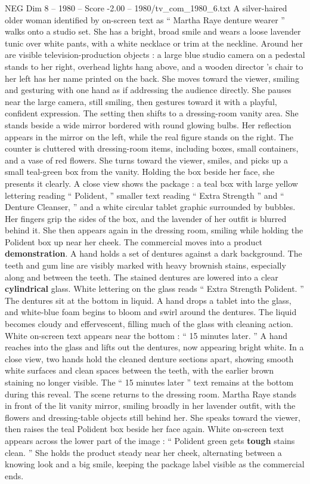 \begin{textsample}{NEG Dim 8 – 1980 – Score -2.00 – 1980/tv\_com\_1980\_6.txt}  \label{ex:f8_neg_057}
A silver-haired older woman identified by on-screen text as “ Martha Raye denture wearer ” walks onto a studio set.
She has a bright, broad smile and wears a loose lavender tunic over white pants, with a white necklace or trim at the neckline.
Around her are visible television-production objects : a large blue studio camera on a pedestal stands to her right, overhead lights hang above, and a wooden director ’s chair to her left has her name printed on the back.
She moves toward the viewer, smiling and gesturing with one hand as if addressing the audience directly.
She pauses near the large camera, still smiling, then gestures toward it with a playful, confident expression.
The setting then shifts to a dressing-room vanity area.
She stands beside a wide mirror bordered with round glowing bulbs.
Her reflection appears in the mirror on the left, while the real figure stands on the right.
The counter is cluttered with dressing-room items, including boxes, small containers, and a vase of red flowers.
She turns toward the viewer, smiles, and picks up a small teal-green box from the vanity.
Holding the box beside her face, she presents it clearly.
A close view shows the package : a teal box with large yellow lettering reading “ Polident, ” smaller text reading “ Extra Strength ” and “ Denture Cleanser, ” and a white circular tablet graphic surrounded by bubbles.
Her fingers grip the sides of the box, and the lavender of her outfit is blurred behind it.
She then appears again in the dressing room, smiling while holding the Polident box up near her cheek.
The commercial moves into a product \textbf{demonstration}.
A hand holds a set of dentures against a dark background.
The teeth and gum line are visibly marked with heavy brownish stains, especially along and between the teeth.
The stained dentures are lowered into a clear \textbf{cylindrical} glass.
White lettering on the glass reads “ Extra Strength Polident. ” The dentures sit at the bottom in liquid.
A hand drops a tablet into the glass, and white-blue foam begins to bloom and swirl around the dentures.
The liquid becomes cloudy and effervescent, filling much of the glass with cleaning action.
White on-screen text appears near the bottom : “ 15 minutes later. ” A hand reaches into the glass and lifts out the dentures, now appearing bright white.
In a close view, two hands hold the cleaned denture sections apart, showing smooth white surfaces and clean spaces between the teeth, with the earlier brown staining no longer visible.
The “ 15 minutes later ” text remains at the bottom during this reveal.
The scene returns to the dressing room.
Martha Raye stands in front of the lit vanity mirror, smiling broadly in her lavender outfit, with the flowers and dressing-table objects still behind her.
She speaks toward the viewer, then raises the teal Polident box beside her face again.
White on-screen text appears across the lower part of the image : “ Polident green gets \textbf{tough} stains clean. ” She holds the product steady near her cheek, alternating between a knowing look and a big smile, keeping the package label visible as the commercial ends.

\end{textsample}
